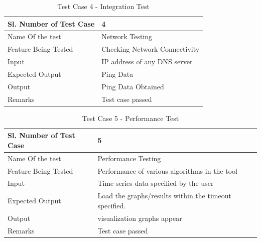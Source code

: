 \documentclass[12pt,a4paper]{report}
\begin{document}
\begin{table}
    \begin{tabular}{|l|l|}
    \hline
    Sl. Number of Test Case & 4                             \\ \hline
    Name Of the test        & Network Testing               \\ \hline
    Feature Being Tested    & Checking Network Connectivity \\ \hline
    Input                   & IP address of any DNS server  \\ \hline
    Expected Output         & Ping Data                     \\ \hline
    Output                  & Ping Data Obtained            \\ \hline
    Remarks                 & Test case passed              \\ \hline
    \end{tabular}
    \caption {Test Case 4 - Integration Test}
\end{table}

\begin{table}
    \begin{tabular}{|l|l|}
    \hline
    Sl. Number of Test Case & 5                             \\ \hline
    Name Of the test        & Performance Testing               \\ \hline
    Feature Being Tested    & Performance of various algorithms in the tool\\ \hline
    Input                   & Time series data specified by the user  \\ \hline
    Expected Output         & Load the graphs/results within the timeout specified.   \\ \hline
    Output                  & visualization graphs appear           \\ \hline
    Remarks                 & Test case passed              \\ \hline
    \end{tabular}
    \caption {Test Case 5 - Performance Test}
\end{table}
\end{document}
